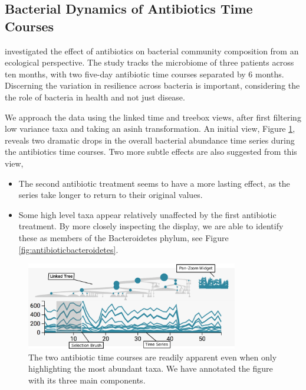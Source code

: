 \documentclass[12pt]{article}
\begin{document}
\subsection{Bacterial Dynamics of Antibiotics Time
Courses}\label{bacterial-dynamics-of-antibiotics-time-courses}

\citet{dethlefsen2008pervasive} investigated the effect of antibiotics on
bacterial community composition from an ecological perspective. The study tracks
the microbiome of three patients across ten months, with two five-day antibiotic
time courses separated by 6 months. Discerning the variation in resilience
across bacteria is important, considering the the role of bacteria in health and
not just disease.

We approach the data using the linked time and treebox views, after first
filtering low variance taxa and taking an \(\text{asinh}\) transformation. An
initial view, Figure \ref{fig:antibioticoverview}, reveals two dramatic drops in
the overall bacterial abundance time series during the antibiotics time courses.
Two more subtle effects are also suggested from this view,

\begin{itemize}
\item
  The second antibiotic treatment seems to have a more lasting effect,
  as the series take longer to return to their original values.
\item
  Some high level taxa appear relatively unaffected by the first
  antibiotic treatment. By more closely inspecting the display, we are
  able to identify these as members of the Bacteroidetes phylum, see
  Figure \ref{fig:antibioticbacteroidetes}.
\end{itemize}

\begin{figure}

{\centering \includegraphics[width=350px]{figure/annotated_antibiotic_overview}

}

\caption{The two antibiotic time courses are readily apparent even when only highlighting the most abundant taxa. We have annotated the figure with its three main components.}\label{fig:antibioticoverview}
\end{figure}
\end{document}
